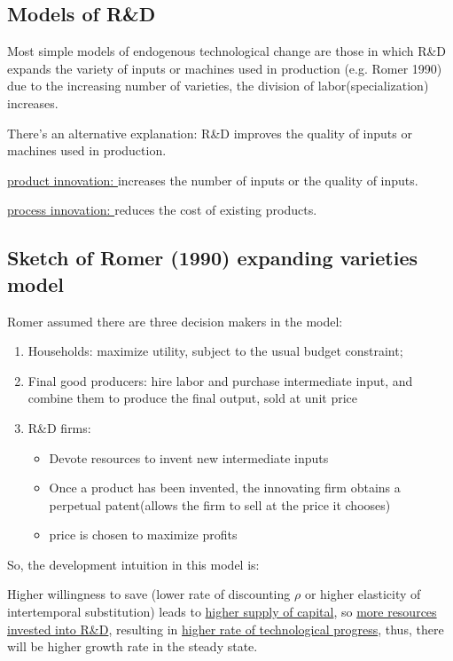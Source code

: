 \subsection{Models of R\&D}
Most simple models of endogenous technological change are those in
which R\&D expands the variety of inputs or machines used in
production (e.g. Romer 1990) due to the increasing number of varieties,
the division of labor(specialization) increases.

There's an alternative explanation: R\&D improves the quality of inputs or machines used in
production.

\underline{product innovation: }increases the number of inputs or the quality
of inputs.

\underline{process innovation: }reduces the cost of existing products.

\subsection{Sketch of Romer (1990) expanding varieties model}

Romer assumed there are three decision makers in the model:
\begin{enumerate}
    \item Households: maximize utility, subject to the usual budget constraint;
    \item Final good producers: hire labor and purchase intermediate input,
    and combine them to produce the final output, sold at unit price
    \item R\&D firms:
        \begin{itemize}
            \item Devote resources to invent new intermediate inputs
            \item Once a product has been invented, the innovating firm obtains a
            perpetual patent(allows the firm to sell at the price it chooses)
            \item price is chosen to maximize profits
        \end{itemize}
\end{enumerate}

So, the development intuition in this model is:

Higher willingness to save (lower rate of discounting $\rho $ or higher
elasticity of intertemporal substitution) leads to \underline{higher supply of capital},
so \underline{more resources invested into R\&D}, resulting in
\underline{higher rate of technological progress}, thus, there will be higher growth rate in the steady state.

